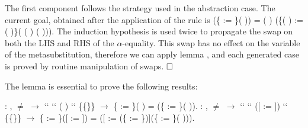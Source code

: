 \begin{coqdoccode}
\end{coqdoccode}
The first component follows the strategy used in the abstraction case. The current goal, obtained after the application of the rule  is    (\{ := \}(   )) =
    (   ) (\{(   ) := (   )\}( (   )  (   ))). The induction hypothesis is used twice to propagate the swap on both the LHS and RHS of the $\alpha$-equality. This swap has no effect on the variable  of the metasubstitution, therefore we can apply lemma , and each generated case is proved by routine manipulation of swaps. $\hfill\Box$
\begin{coqdoccode}
\coqdocemptyline
\end{coqdoccode}
The lemma  is essential to prove the following results:
\begin{coqdoccode}
\coqdocemptyline
\coqdocnoindent
{} : \coqdockw{\ensuremath{\forall}}     ,  \ensuremath{\not=}  \ensuremath{\rightarrow}  ``   ``  (  ) `` \{\{\}\} \ensuremath{\rightarrow} \{ := \}(  ) =   (\{ := \}(   )).\coqdoceol
\coqdocemptyline
\coqdocnoindent
{}  : \coqdockw{\ensuremath{\forall}}      ,  \ensuremath{\not=}  \ensuremath{\rightarrow}  ``   ``  ([ := ]) `` \{\{\}\} \ensuremath{\rightarrow} \{ := \}([ := ]) = ([ := (\{ := \})](\{ := \}(   ))).\coqdoceol
\coqdocemptyline
\end{coqdoccode}
